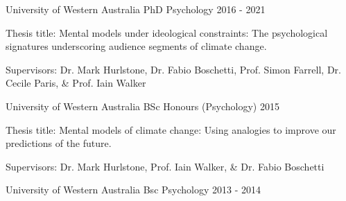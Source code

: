 

\begin{cventries}

  \cventry
    {University of Western Australia} %
    {PhD Psychology} %
    {}%
    {2016 - 2021} %
    {
      \begin{cvitems} %
        \item {Thesis title: Mental models under ideological constraints: The psychological signatures underscoring audience segments of climate change.}
        \item {Supervisors: Dr. Mark Hurlstone, Dr. Fabio Boschetti, Prof. Simon Farrell, Dr. Cecile Paris, \& Prof. Iain Walker}
      \end{cvitems}
    }

  \cventry
    {University of Western Australia} %
    {BSc Honours (Psychology)} %
    {} %
    {2015} %
    {
      \begin{cvitems} %
        \item {Thesis title: Mental models of climate change: Using analogies to improve our predictions of the future.}
        \item {Supervisors: Dr. Mark Hurlstone, Prof. Iain Walker, \& Dr. Fabio Boschetti}
      \end{cvitems}
    }

  \cventry
    {University of Western Australia} %
    {Bsc Psychology} %
    {} %
    {2013 - 2014} %
    {}

\end{cventries}
